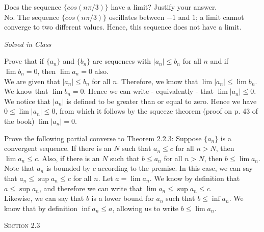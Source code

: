 \documentclass[12pt]{article}
\newenvironment{exercise}[2][Exercise]{\begin{trivlist}
\item[\hskip \labelsep {\bfseries #1}\hskip \labelsep {\bfseries #2.}]}{\end{trivlist}}
\begin{document}
\begin{exercise}{2.2.9}
Does the sequence $\{cos(n \pi /3)\}$ have a limit? Justify your answer. \\

No. The sequence $\{cos(n \pi /3)\}$ oscillates between $-1$ and $1$; a limit cannot converge to two different values. Hence, this sequence does not have a limit.
\end{exercise}

\begin{exercise}{2.2.10}
\emph{Solved in Class}
\end{exercise}

\begin{exercise}{2.2.11}
Prove that if $\{a_n\}$ and $\{b_n\}$ are sequences with $|a_n| \leq b_n$ for all $n$ and if $\lim b_n =0$, then $\lim a_n = 0$ also. \\

We are given that $ |a_n|  \leq b_n$ for all $n$. Therefore, we know that $ \lim |a_n| \leq \lim b_n$. We know that $\lim b_n = 0$. Hence we can write - equivalently - that $\lim |a_n| \leq 0$. We notice that $|a_n|$ is defined to be greater than or equal to zero. Hence we have $0 \leq \lim |a_n| \leq 0$, from which it follows by the squeeze theorem (proof on p. 43 of the book) $\lim |a_n| = 0$.
\end{exercise}


\begin{exercise}{2.2.12}
Prove the following partial converse to Theorem 2.2.3: Suppose $\{a_n\}$ is a convergent sequence. If there is an $N$ such that $a_n \leq c$ for all $n > N$, then $\lim a_n \leq c$. Also, if there is an $N$ such that $b \leq a_n$ for all $n > N$, then $b \leq \lim a_n$. \\

Note that ${a_n}$ is bounded by $c$ according to the premise. In this case, we can say that $a_n \leq \sup a_n \leq c$ for all $n$. Let $ a = \lim a_n$. We know by definition that $a \leq \sup a_n$, and therefore we can write that $\lim a_n \leq \sup a_n \leq c$. \\
Likewise, we can say that $b$ is a lower bound for $a_n$ such that $b \leq \inf a_n$. We know that by definition $\inf a_n \leq a$, allowing us to write $b \leq \lim a_n$.
\end{exercise}


\begin{center}
\textsc{\Large Section 2.3}
\end{center}
\end{document}
